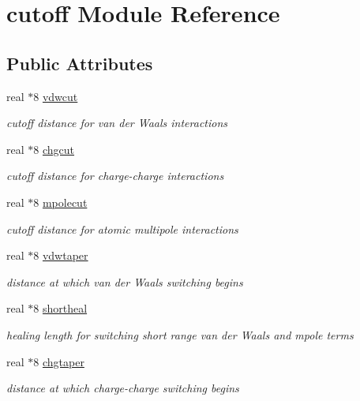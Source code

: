 \hypertarget{classcutoff}{\section{cutoff Module Reference}
\label{classcutoff}
}
\subsection*{Public Attributes}
\begin{DoxyCompactItemize}
\item 
real $\ast$8 \hyperlink{classcutoff_a931958c0426a4246d73339c2b249bdcc}{vdwcut}
\begin{DoxyCompactList}\small\item\em cutoff distance for van der Waals interactions \end{DoxyCompactList}\item 
real $\ast$8 \hyperlink{classcutoff_abe0483dfbdbe284cc5914fe66e689711}{chgcut}
\begin{DoxyCompactList}\small\item\em cutoff distance for charge-\/charge interactions \end{DoxyCompactList}\item 
real $\ast$8 \hyperlink{classcutoff_a976eaa95d9a6a3f903ada6930d43617b}{mpolecut}
\begin{DoxyCompactList}\small\item\em cutoff distance for atomic multipole interactions \end{DoxyCompactList}\item 
real $\ast$8 \hyperlink{classcutoff_a807a24c28103ec7547be8bd3b5ec9314}{vdwtaper}
\begin{DoxyCompactList}\small\item\em distance at which van der Waals switching begins \end{DoxyCompactList}\item 
real $\ast$8 \hyperlink{classcutoff_a9f17980720278e5796449a35477f55ee}{shortheal}
\begin{DoxyCompactList}\small\item\em healing length for switching short range van der Waals and mpole terms \end{DoxyCompactList}\item 
real $\ast$8 \hyperlink{classcutoff_a806d1743b0716c7f476bd199bb829ac5}{chgtaper}
\begin{DoxyCompactList}\small\item\em distance at which charge-\/charge switching begins \end{DoxyCompactList}\item 

\end{DoxyCompactItemize}
